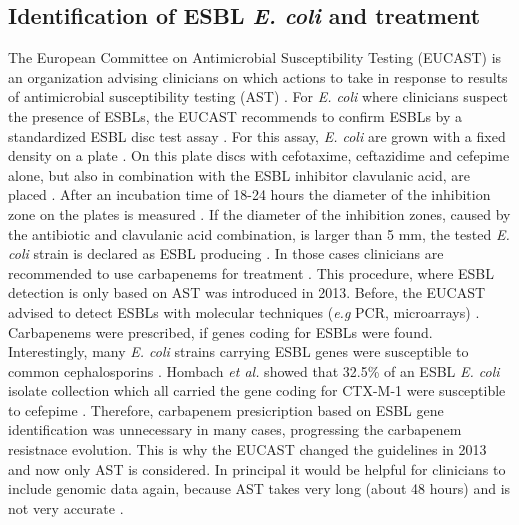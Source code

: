 \subsection{Identification of ESBL \textit{E. coli} and treatment}
The European Committee on Antimicrobial Susceptibility Testing (EUCAST) is an organization advising clinicians on which actions to take in response to results of  antimicrobial susceptibility testing (AST) \cite{leclercq_eucast_2013}. For \textit{E. coli} where clinicians suspect the presence of ESBLs, the EUCAST recommends to confirm ESBLs by a standardized ESBL disc test assay \cite{hombach_consequences_2013}. For this assay, \textit{E. coli} are grown with a fixed density on a plate \cite{disc_test}. On this plate discs with cefotaxime, ceftazidime and cefepime alone, but also in combination with the ESBL inhibitor clavulanic acid, are placed \cite{disc_test}. After an incubation time of 18-24 hours the diameter of the inhibition zone on the plates is measured \cite{disc_test}. If the diameter of the inhibition zones, caused by the antibiotic and clavulanic acid combination, is larger than 5 mm, the tested \textit{E. coli} strain is declared as ESBL producing \cite{disc_test}. In those cases clinicians are recommended to use carbapenems for treatment \cite{mcwilliams_incidence_2014}. This procedure, where ESBL detection is only based on AST was introduced in 2013. Before, the EUCAST advised to detect ESBLs with molecular techniques (\textit{e.g} PCR, microarrays) \cite{screening}. Carbapenems were prescribed, if genes coding for ESBLs were found. Interestingly, many \textit{E. coli} strains carrying ESBL genes were susceptible to common cephalosporins \cite{hombach_consequences_2013}.
Hombach \textit{et al.} showed that 32.5\% of an ESBL \textit{E. coli} isolate collection which all carried the gene coding for CTX-M-1 were susceptible to cefepime \cite{hombach_consequences_2013}. Therefore, carbapenem presicription based on ESBL gene identification was unnecessary in many cases, progressing the carbapenem resistnace evolution. This is why the EUCAST changed the guidelines in 2013 and now only AST is considered. In principal it would be helpful for clinicians to include genomic data again, because AST takes very long (about 48 hours) and is not very accurate \cite{disc_test}\cite{hombach_consequences_2013}.

